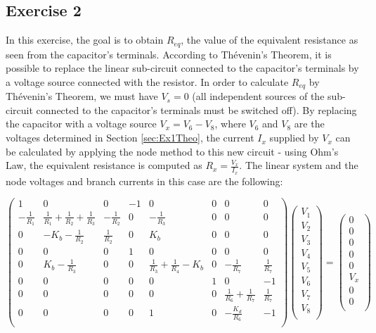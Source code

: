 \subsection{Exercise 2} \label{sec:Ex2Theo}

In this exercise, the goal is to obtain $R_{eq}$, the value of the equivalent resistance as seen from the capacitor's terminals. According to Thévenin's Theorem, it is possible to replace the linear sub-circuit connected to the capacitor's terminals by a voltage source connected with the resistor. In order to calculate $R_{eq}$ by Thévenin's Theorem, we must have $V_s=0$ (all independent sources of the sub-circuit connected to the capacitor's terminals must be switched off). By replacing the capacitor with a voltage source $V_x=V_6-V_8$, where $V_6$ and $V_8$ are the voltages determined in Section \ref{sec:Ex1Theo}, the current $I_x$ supplied by $V_x$ can be calculated by applying the node method to this new circuit - using Ohm's Law, the equivalent resistance is computed as $R_x=\frac{V_x}{I_x}$. The linear system and the node voltages and branch currents in this case are the following:

\begin{equation}
  \begin{pmatrix}
    1 & 0 & 0 & -1 & 0 & 0 & 0 & 0 \\
    -\frac{1}{R_1} & \frac{1}{R_1}+\frac{1}{R_2}+\frac{1}{R_3} & -\frac{1}{R_2} & 0 & -\frac{1}{R_3} & 0 & 0 & 0 \\
    0 & -K_b-\frac{1}{R_2} & \frac{1}{R_2} & 0 & K_b & 0 & 0 & 0 \\
    0 & 0 & 0 & 1 & 0 & 0 & 0 & 0 \\
    0 & K_b-\frac{1}{R_3} & 0 & 0 & \frac{1}{R_3}+\frac{1}{R_4}-K_b & 0 & -\frac{1}{R_7} & \frac{1}{R_7} \\
    0 & 0 & 0 & 0 & 0 & 1 & 0 & -1 \\
    0 & 0 & 0 & 0 & 0 & 0 & \frac{1}{R_6}+\frac{1}{R_7} & \frac{1}{R_7} \\
    0 & 0 & 0 & 0 & 1 & 0 & -\frac{K_d}{R_6} & -1 \\
  \end{pmatrix}
  \begin{pmatrix}
    V_1  \\
    V_2  \\
    V_3  \\
    V_4  \\
    V_5  \\
    V_6  \\
    V_7  \\
    V_8  \\
  \end{pmatrix}
  =
  \begin{pmatrix}
    0 \\
    0 \\
    0 \\
    0 \\
    0 \\
    V_x \\
    0 \\
    0 \\
  \end{pmatrix}
  \label{eq:Exercise2LinearSystem}
\end{equation}

